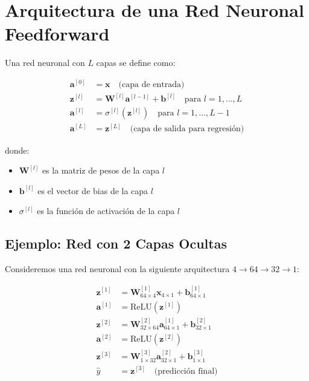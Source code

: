 \documentclass[12pt]{article}
\begin{document}
\section{Arquitectura de una Red Neuronal Feedforward}


Una red neuronal con $L$ capas se define como:

\begin{align}
\mathbf{a}^{[0]} &= \mathbf{x} \quad \text{(capa de entrada)} \\
\mathbf{z}^{[l]} &= \mathbf{W}^{[l]} \mathbf{a}^{[l-1]} + \mathbf{b}^{[l]} \quad \text{para } l = 1, \dots, L \\
\mathbf{a}^{[l]} &= \sigma^{[l]}(\mathbf{z}^{[l]}) \quad \text{para } l = 1, \dots, L-1 \\
\mathbf{a}^{[L]} &= \mathbf{z}^{[L]} \quad \text{(capa de salida para regresión)}
\end{align}

donde:
\begin{itemize}
\item $\mathbf{W}^{[l]}$ es la matriz de pesos de la capa $l$
\item $\mathbf{b}^{[l]}$ es el vector de bias de la capa $l$
\item $\sigma^{[l]}$ es la función de activación de la capa $l$
\end{itemize}

\subsection{Ejemplo: Red con 2 Capas Ocultas}

Consideremos una red neuronal con la siguiente arquitectura $4 \to 64 \to 32 \to 1$:

\begin{align}
\mathbf{z}^{[1]} &= \mathbf{W}^{[1]}_{64 \times 4} \mathbf{x}_{4 \times 1} + \mathbf{b}^{[1]}_{64 \times 1} \\
\mathbf{a}^{[1]} &= \text{ReLU}(\mathbf{z}^{[1]}) \\
\mathbf{z}^{[2]} &= \mathbf{W}^{[2]}_{32 \times 64} \mathbf{a}^{[1]}_{64 \times 1} + \mathbf{b}^{[2]}_{32 \times 1} \\
\mathbf{a}^{[2]} &= \text{ReLU}(\mathbf{z}^{[2]}) \\
\mathbf{z}^{[3]} &= \mathbf{W}^{[3]}_{1 \times 32} \mathbf{a}^{[2]}_{32 \times 1} + \mathbf{b}^{[3]}_{1 \times 1} \\
\hat{y} &= \mathbf{z}^{[3]} \quad \text{(predicción final)}
\end{align}
\end{document}
